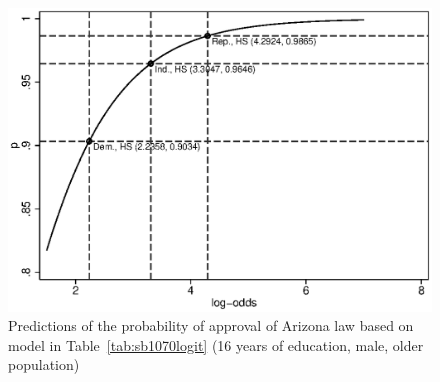 \begin{figure}
   \centering
   \includegraphics[angle=0,
           width=.75\textwidth]{sb1070col.eps}
   \caption{Predictions of the probability of approval of Arizona law based on model in Table~\ref{tab:sb1070logit} (16 years of education, male, older population)}
  \label{fig:sb1070col}
\end{figure}